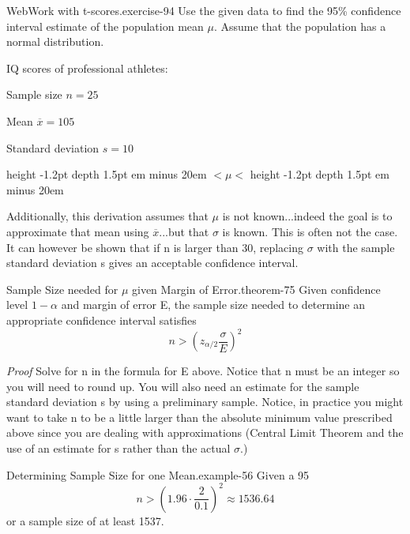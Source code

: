 \documentclass[10pt,]{book}
\makeatletter
\newcommand{\fillin}[1]{\leavevmode\leaders\vrule height -1.2pt depth 1.5pt \hskip #1em minus #1em \null}
\renewcommand*{\proofname}{Proof}
\renewenvironment{proof}[1][\proofname]{\par
  \pushQED{\qed}%
  \normalfont \topsep6\p@\@plus6\p@\relax
  \trivlist
  \item\relax
    {\itshape
    #1\@addpunct{.}}\hspace\labelsep\ignorespaces
}{%
  \popQED\endtrivlist\@endpefalse
}
\numberwithin{equation}{section}
\newcommand{\lt}{<}
\newcommand{\gt}{>}
\makeatother
\begin{document}
\begin{inlineexercise}{WebWork with t-scores.}{exercise-94}%
\hypertarget{p-1388}{}%
Use the given data to find the 95\% confidence interval estimate of the population mean \(\mu\). Assume that the population has a normal distribution.%
\par
\hypertarget{p-1389}{}%
IQ scores of professional athletes:%
\par
\hypertarget{p-1390}{}%
Sample size \(n = 25\)%
\par
\hypertarget{p-1391}{}%
Mean \(\overline{x} = 105\)%
\par
\hypertarget{p-1392}{}%
Standard deviation \(s  = 10\)%
\par
\hypertarget{p-1393}{}%
 \fillin{20} \(\lt  \mu \lt \)  \fillin{20}%
\end{inlineexercise}
%
\par
\hypertarget{p-1394}{}%
Additionally, this derivation assumes that \(\mu\) is not known...indeed the goal is to approximate that mean using \(\overline{x}\)...but that \(\sigma\) is known. This is often not the case. It can however be shown that if n is larger than 30, replacing \(\sigma\) with the sample standard deviation s gives an acceptable confidence interval.%
\begin{theorem}{Sample Size needed for \(\mu\) given Margin of Error.}{}{theorem-75}%
\hypertarget{p-1395}{}%
Given confidence level \(1-\alpha\) and margin of error E, the sample size needed to determine an appropriate confidence interval satisfies%
\begin{equation*}
n \gt \left ( z_{\alpha /2} \frac{\sigma}{E} \right )^2
\end{equation*}
%
\end{theorem}
\begin{proof}\hypertarget{proof-75}{}
\hypertarget{p-1396}{}%
Solve for n in the formula for E above. Notice that n must be an integer so you will need to round up. You will also need an estimate for the sample standard deviation s by using a preliminary sample.%
\end{proof}
\hypertarget{p-1397}{}%
Notice, in practice you might want to take n to be a little larger than the absolute minimum value prescribed above since you are dealing with approximations (Central Limit Theorem and the use of an estimate for s rather than the actual \(\sigma\).)%
\begin{example}{Determining Sample Size for one Mean.}{example-56}%
\hypertarget{p-1398}{}%
Given a 95%
\begin{equation*}
n \gt \left ( 1.96 \cdot \frac{2}{0.1} \right )^2 \approx 1536.64
\end{equation*}
or a sample size of at least 1537.%
\end{example}
%
%
\typeout{************************************************}
\typeout{************************************************}
%
\end{document}
